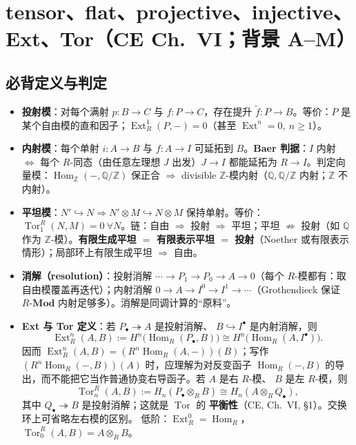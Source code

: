 \documentclass[12pt,a4paper]{ctexart}
\DeclareMathOperator{\Hom}{Hom}
\DeclareMathOperator{\Ext}{Ext}
\DeclareMathOperator{\Tor}{Tor}
\newcommand{\keypoint}{\text{\textbf{\ensuremath{\bigstar}}\;}}
\begin{document}
\section{tensor、flat、projective、injective、Ext、Tor（CE Ch.~VI；背景 A--M）}

\subsection{必背定义与判定}

\begin{itemize}
  \item \textbf{投射模}：对每个满射 $p\colon B\to C$ 与 $f\colon P\to C$，存在提升 $\tilde f\colon P\to B$。等价：\keypoint $P$ 是某个自由模的直和因子；$\Ext^1_R(P,-)=0$（甚至 $\Ext^n=0,\ n\ge1$）。
  \item \textbf{内射模}：每个单射 $i\colon A\to B$ 与 $f\colon A\to I$ 可延拓到 $B$。\keypoint \textbf{Baer 判据}：$I$ 内射 $\iff$ 每个 $R$-同态（由任意左理想 $J$ 出发）$J\to I$ 都能延拓为 $R\to I$。判定向量模：$\Hom_\mathbb Z(-,\mathbb Q/\mathbb Z)$ 保正合 $\Rightarrow$ divisible $\mathbb Z$-模内射（$\mathbb Q,\mathbb Q/\mathbb Z$ 内射；$\mathbb Z$ 不内射）。
  \item \textbf{平坦模}：$N'\hookrightarrow N\Rightarrow N'\otimes M\hookrightarrow N\otimes M$ 保持单射。等价：$\Tor_1^R(N,M)=0\ \forall N$。\keypoint 链：自由 $\Rightarrow$ 投射 $\Rightarrow$ 平坦；平坦 $\not\Rightarrow$ 投射（如 $\mathbb Q$ 作为 $\mathbb Z$-模）。\textbf{有限生成平坦 $=$ 有限表示平坦 $=$ 投射}（Noether 或有限表示情形）；局部环上有限生成平坦 $\Rightarrow$ 自由。
  \item \textbf{消解（resolution）}：投射消解 $\cdots\to P_1\to P_0\to A\to0$（每个 $R$-模都有：取自由模覆盖再迭代）；内射消解 $0\to A\to I^0\to I^1\to\cdots$（Grothendieck 保证 $R\text{-}\mathbf{Mod}$ 内射足够多）。\keypoint 消解是同调计算的“原料”。
  \item \textbf{Ext 与 Tor 定义}：若 $P_\bullet\twoheadrightarrow A$ 是投射消解、
  $B\hookrightarrow I^\bullet$ 是内射消解，则
  \[
    \Ext_R^n(A,B)
    :=H^n\!\bigl(\Hom_R(P_\bullet,B)\bigr)
    \cong H^n\!\bigl(\Hom_R(A,I^\bullet)\bigr).
  \]
  因而 $\Ext_R^n(A,B)=(R^n\Hom_R(A,-))(B)$；写作
  $(R^n\Hom_R(-,B))(A)$ 时，应理解为对反变函子 $\Hom_R(-,B)$
  的导出，而不能把它当作普通协变右导函子。若 $A$ 是右 $R$-模、
  $B$ 是左 $R$-模，则
  \[
    \Tor_n^R(A,B):=H_n(P_\bullet\otimes_R B)
    \cong H_n(A\otimes_R Q_\bullet),
  \]
  其中 $Q_\bullet\twoheadrightarrow B$ 是投射消解；这就是 $\Tor$ 的
  \textbf{平衡性}（CE, Ch.~VI, \S1）。交换环上可省略左右模的区别。
  低阶：$\Ext_R^0=\Hom_R$，$\Tor_0^R(A,B)=A\otimes_RB$。
\end{itemize}
\end{document}
